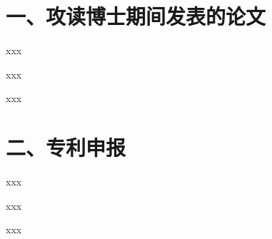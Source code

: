 \documentclass[openright,twoside]{UJS-PhD-thesis}
\begin{document}
\section*{一、攻读博士期间发表的论文}

\begin{enumerate}[label={{[}\arabic*{]}},nosep]
\item xxx
\item xxx
\item xxx
\end{enumerate}

\section*{二、专利申报}

\begin{enumerate}[label={{[}\arabic*{]}},nosep]
\item xxx
\item xxx
\item xxx
\end{enumerate}
\end{document}
